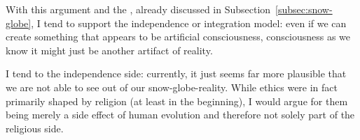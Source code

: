 With this argument and the , already discussed in Subsection~\ref{subsec:snow-globe}, I tend to support the independence or integration model: even if we can create something that appears to be artificial consciousness, consciousness as we know it might just be another artifact of  reality.

I tend to the independence side: currently, it just seems far more plausible that we are not able to see out of our snow-globe-reality.
While ethics were in fact primarily shaped by religion (at least in the beginning), I would argue for them being merely a side effect of human evolution and therefore not solely part of the religious side.